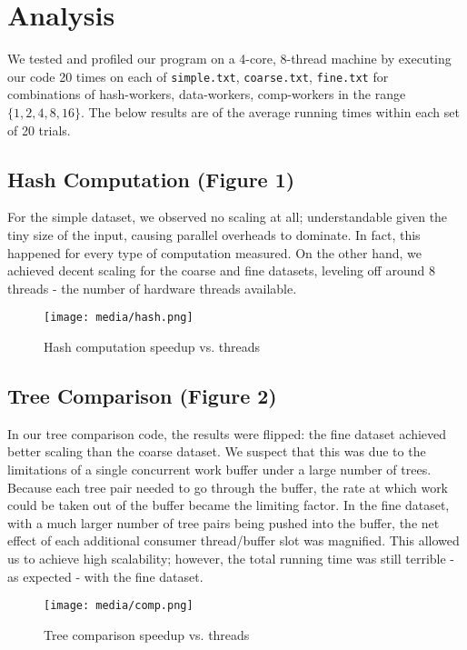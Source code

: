 \documentclass[11pt]{article}
\begin{document}
\section{Analysis}
We tested and profiled our program on a 4-core, 8-thread machine by executing our code 20 times on each of \texttt{simple.txt}, \texttt{coarse.txt}, \texttt{fine.txt} for combinations of hash-workers, data-workers, comp-workers in the range $\{1, 2, 4, 8, 16\}$. The below results are of the average running times within each set of 20 trials.

\subsection{Hash Computation (Figure 1)}
For the simple dataset, we observed no scaling at all; understandable given the tiny size of the input, causing parallel overheads to dominate. In fact, this happened for every type of computation measured. On the other hand, we achieved decent scaling for the coarse and fine datasets, leveling off around 8 threads - the number of hardware threads available. 

\begin{figure}[t]
    \centering
    \texttt{[image: media/hash.png]}
    \caption{Hash computation speedup vs. threads}
\end{figure}

\subsection{Tree Comparison (Figure 2)}
In our tree comparison code, the results were flipped: the fine dataset achieved better scaling than the coarse dataset. We suspect that this was due to the limitations of a single concurrent work buffer under a large number of trees. Because each tree pair needed to go through the buffer, the rate at which work could be taken out of the buffer became the limiting factor. In the fine dataset, with a much larger number of tree pairs being pushed into the buffer, the net effect of each additional consumer thread/buffer slot was magnified. This allowed us to achieve high scalability; however, the total running time was still terrible - as expected - with the fine dataset.

\begin{figure}[t]
    \centering
    \texttt{[image: media/comp.png]}
    \caption{Tree comparison speedup vs. threads}
\end{figure}
\end{document}
